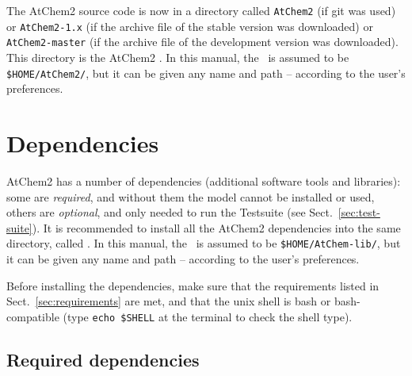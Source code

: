The AtChem2 source code is now in a directory called \texttt{AtChem2}
(if git was used) or \texttt{AtChem2-1.x} (if the archive file of the
stable version was downloaded) or \texttt{AtChem2-master} (if the
archive file of the development version was downloaded). This
directory is the AtChem2 \maindir. In this manual, the \maindir\ is
assumed to be \texttt{\$HOME/AtChem2/}, but it can be given any name
and path -- according to the user's preferences.

\section{Dependencies} \label{sec:dependencies}

AtChem2 has a number of dependencies (additional software tools and
libraries): some are \emph{required}, and without them the model
cannot be installed or used, others are \emph{optional}, and only
needed to run the Testsuite (see Sect.~\ref{sec:test-suite}).  It is
recommended to install all the AtChem2 dependencies into the same
directory, called \depdir. In this manual, the \depdir\ is assumed to
be \texttt{\$HOME/AtChem-lib/}, but it can be given any name and path
-- according to the user's preferences.

Before installing the dependencies, make sure that the requirements
listed in Sect.~\ref{sec:requirements} are met, and that the unix
shell is bash or bash-compatible (type \verb|echo $SHELL| at the
terminal to check the shell type).

\subsection{Required dependencies} \label{subsec:required-dependencies}



